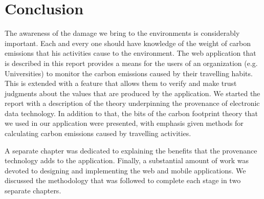 
\chapter{Conclusion} %
\label{Conclusion}

The awareness of the damage we bring to the environments is considerably important. Each and every one should have knowledge of the weight of carbon emissions that his activities cause to the environment.  The web application that is described in this report provides a means for the users of an organization (e.g. Universities) to monitor the carbon emissions caused by their travelling habits. This is extended with a feature that allows them to verify and make trust judgments about the values that are produced by the application.
We started the report with a description of the theory underpinning the provenance of electronic data technology. In addition to that, the bits of the carbon footprint theory that we used in our application were presented, with emphasis given methods for calculating carbon emissions caused by travelling activities.

A separate chapter was dedicated to explaining the benefits that the provenance technology adds to the application. Finally, a substantial amount of work was devoted to designing and implementing the web and mobile applications.  We discussed the methodology that was followed to complete each stage in two separate chapters.
